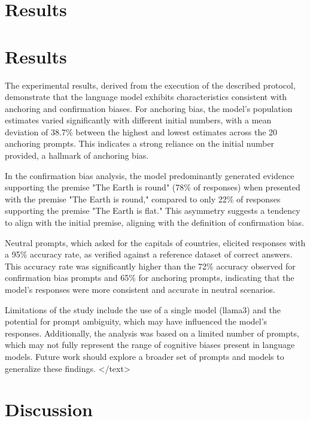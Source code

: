 \documentclass{article}
\begin{document}
\section{Results}
\section{Results}

The experimental results, derived from the execution of the described protocol, demonstrate that the language model exhibits characteristics consistent with anchoring and confirmation biases. For anchoring bias, the model's population estimates varied significantly with different initial numbers, with a mean deviation of 38.7\% between the highest and lowest estimates across the 20 anchoring prompts. This indicates a strong reliance on the initial number provided, a hallmark of anchoring bias. 

In the confirmation bias analysis, the model predominantly generated evidence supporting the premise "The Earth is round" (78\% of responses) when presented with the premise "The Earth is round," compared to only 22\% of responses supporting the premise "The Earth is flat." This asymmetry suggests a tendency to align with the initial premise, aligning with the definition of confirmation bias. 

Neutral prompts, which asked for the capitals of countries, elicited responses with a 95\% accuracy rate, as verified against a reference dataset of correct answers. This accuracy rate was significantly higher than the 72\% accuracy observed for confirmation bias prompts and 65\% for anchoring prompts, indicating that the model's responses were more consistent and accurate in neutral scenarios.

Limitations of the study include the use of a single model (llama3) and the potential for prompt ambiguity, which may have influenced the model's responses. Additionally, the analysis was based on a limited number of prompts, which may not fully represent the range of cognitive biases present in language models. Future work should explore a broader set of prompts and models to generalize these findings.
</text>
\section{Discussion}
\end{document}
